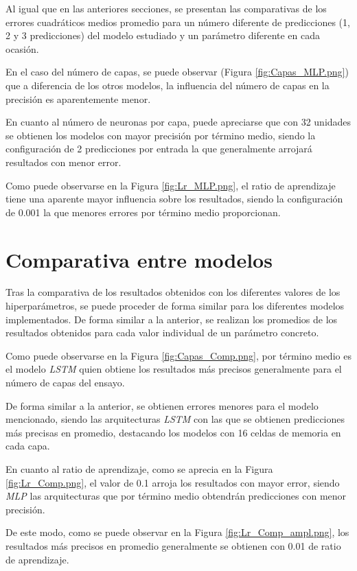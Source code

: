 Al igual que en las anteriores secciones, se presentan las comparativas de los errores 
cuadráticos medios promedio para un número diferente de predicciones (1, 2 y 3 predicciones) del modelo 
estudiado y un parámetro diferente en cada ocasión.

En el caso del número de capas, se puede observar (Figura \ref{fig:Capas_MLP.png}) que a diferencia de
los otros modelos, la influencia del número de capas en la precisión es aparentemente menor.

En cuanto al número de neuronas por capa, puede apreciarse que con 32 unidades se obtienen los modelos
con mayor precisión por término medio, siendo la configuración de 2 predicciones por entrada la que
generalmente arrojará resultados con menor error.

Como puede observarse en la Figura \ref{fig:Lr_MLP.png}, el ratio de aprendizaje tiene una aparente
mayor influencia sobre los resultados, siendo la configuración de 0.001 la que menores errores por
término medio proporcionan.

\section{Comparativa entre modelos}
Tras la comparativa de los resultados obtenidos con los diferentes valores de los hiperparámetros, 
se puede proceder de forma similar para los diferentes modelos implementados.
De forma similar a la anterior, se realizan los promedios de los resultados obtenidos para cada valor 
individual de un parámetro concreto.

Como puede observarse en la Figura \ref{fig:Capas_Comp.png}, por término medio es el modelo \textit{LSTM}
quien obtiene los resultados más precisos generalmente para el número de capas del ensayo.

De forma similar a la anterior, se obtienen errores menores para el modelo mencionado, siendo las 
arquitecturas \textit{LSTM} con las que se obtienen predicciones más precisas en promedio, destacando los
modelos con 16 celdas de memoria en cada capa.

En cuanto al ratio de aprendizaje, como se aprecia en la Figura \ref{fig:Lr_Comp.png}, el valor de 
0.1 arroja los resultados con mayor error, siendo \textit{MLP} las arquitecturas que por término medio
obtendrán predicciones con menor precisión.

De este modo, como se puede observar en la Figura \ref{fig:Lr_Comp_ampl.png}, los resultados más precisos
en promedio generalmente se obtienen con 0.01 de ratio de aprendizaje.
